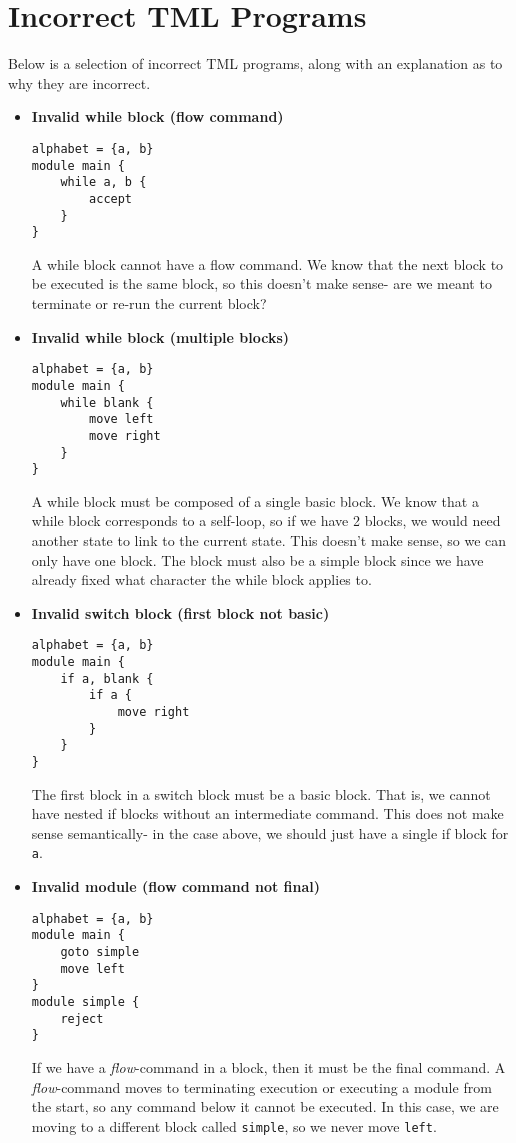 \chapter{Incorrect TML Programs}

Below is a selection of incorrect TML programs, along with an explanation as to why they are incorrect.
\begin{itemize}
    \item \textbf{Invalid while block (flow command)}
\begin{lstlisting}[language=TML]
alphabet = {a, b}
module main {
    while a, b {
        accept
    }
}
\end{lstlisting}
    A while block cannot have a flow command. We know that the next block to be executed is the same block, so this doesn't make sense- are we meant to terminate or re-run the current block?

    \item \textbf{Invalid while block (multiple blocks)}
\begin{lstlisting}[language=TML]
alphabet = {a, b}
module main {
    while blank {
        move left
        move right
    }
}
\end{lstlisting}
    A while block must be composed of a single basic block. We know that a while block corresponds to a self-loop, so if we have 2 blocks, we would need another state to link to the current state. This doesn't make sense, so we can only have one block. The block must also be a simple block since we have already fixed what character the while block applies to.

    \item \textbf{Invalid switch block (first block not basic)}
\begin{lstlisting}[language=TML]
alphabet = {a, b}
module main {
    if a, blank {
        if a {
            move right
        }
    }
}
\end{lstlisting}
    The first block in a switch block must be a basic block. That is, we cannot have nested if blocks without an intermediate command. This does not make sense semantically- in the case above, we should just have a single if block for \texttt{a}.

    \item \textbf{Invalid module (flow command not final)}
\begin{lstlisting}[language=TML]
alphabet = {a, b}
module main {
    goto simple
    move left
}
module simple {
    reject
}
\end{lstlisting}
    If we have a \emph{flow}-command in a block, then it must be the final command. A \emph{flow}-command moves to terminating execution or executing a module from the start, so any command below it cannot be executed. In this case, we are moving to a different block called \texttt{simple}, so we never move \texttt{left}.


\end{itemize}
